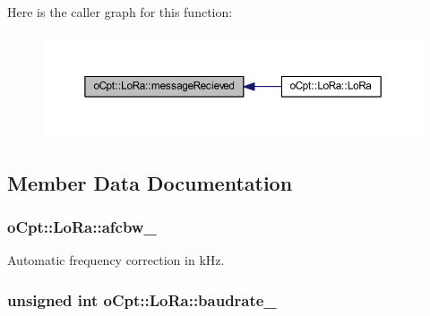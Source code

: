 Here is the caller graph for this function\+:
\nopagebreak
\begin{figure}[H]
\begin{center}
\leavevmode
\includegraphics[width=350pt]{classo_cpt_1_1_lo_ra_a606eeaec7fb73b483f958005444246b4_icgraph}
\end{center}
\end{figure}




\subsection{Member Data Documentation}
\subsubsection[{\texorpdfstring{afcbw\+\_\+}{afcbw_}}]{ o\+Cpt\+::\+Lo\+Ra\+::afcbw\+\_\+\hspace{0.3cm}{\ttfamily [protected]}}\hypertarget{classo_cpt_1_1_lo_ra_a776e20c9dbac73ba02dca35c63ee4807}{}\label{classo_cpt_1_1_lo_ra_a776e20c9dbac73ba02dca35c63ee4807}


Automatic frequency correction in k\+Hz. 

\subsubsection[{\texorpdfstring{baudrate\+\_\+}{baudrate_}}]{\setlength{\rightskip}{0pt plus 5cm}unsigned int o\+Cpt\+::\+Lo\+Ra\+::baudrate\+\_\+\hspace{0.3cm}{\ttfamily [protected]}}\hypertarget{classo_cpt_1_1_lo_ra_a076f477e2096b2a49c8d4c25b79b1143}{}\label{classo_cpt_1_1_lo_ra_a076f477e2096b2a49c8d4c25b79b1143}
